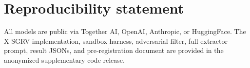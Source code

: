 \documentclass{article}
\begin{document}
\section*{Reproducibility statement}
All models are public via Together AI, OpenAI, Anthropic, or HuggingFace. The X-SGRV implementation, sandbox harness, adversarial filter, full extractor prompt, result JSONs, and pre-registration document are provided in the anonymized supplementary code release.



\end{document}
